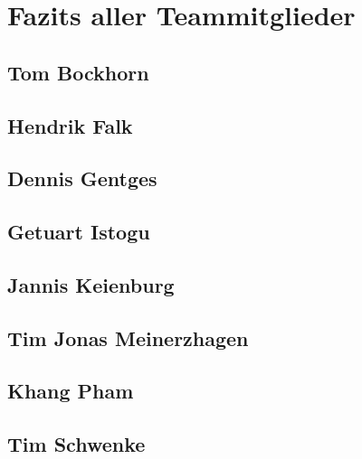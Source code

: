 \section{Fazits aller Teammitglieder}

\subsection{Tom Bockhorn}

\subsection{Hendrik Falk}

\subsection{Dennis Gentges}

\subsection{Getuart Istogu}

\subsection{Jannis Keienburg}

\subsection{Tim Jonas Meinerzhagen}

\subsection{Khang Pham}

\subsection{Tim Schwenke}
